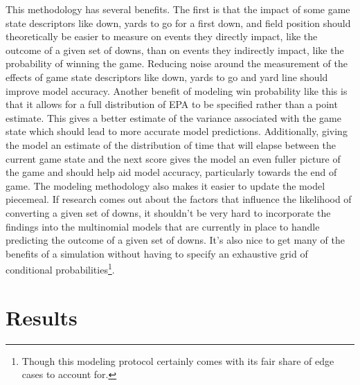 \documentclass[12pt,twoside]{dukestatscithesis}
\begin{document}
This methodology has several benefits. The first is that the impact of some game state descriptors like down, yards to go for a first down, and field position should theoretically be easier to measure on events they directly impact, like the outcome of a given set of downs, than on events they indirectly impact, like the probability of winning the game. Reducing noise around the measurement of the effects of game state descriptors like down, yards to go and yard line should improve model accuracy. Another benefit of modeling win probability like this is that it allows for a full distribution of EPA to be specified rather than a point estimate. This gives a better estimate of the variance associated with the game state which should lead to more accurate model predictions. Additionally, giving the model an estimate of the distribution of time that will elapse between the current game state and the next score gives the model an even fuller picture of the game and should help aid model accuracy, particularly towards the end of game. The modeling methodology also makes it easier to update the model piecemeal. If research comes out about the factors that influence the likelihood of converting a given set of downs, it shouldn't be very hard to incorporate the findings into the multinomial models that are currently in place to handle predicting the outcome of a given set of downs. It's also nice to get many of the benefits of a simulation without having to specify an exhaustive grid of conditional probabilities\footnote{Though this modeling protocol certainly comes with its fair share of edge cases to account for.}.

\hypertarget{results}{%
\chapter{Results}\label{results}}
\end{document}

